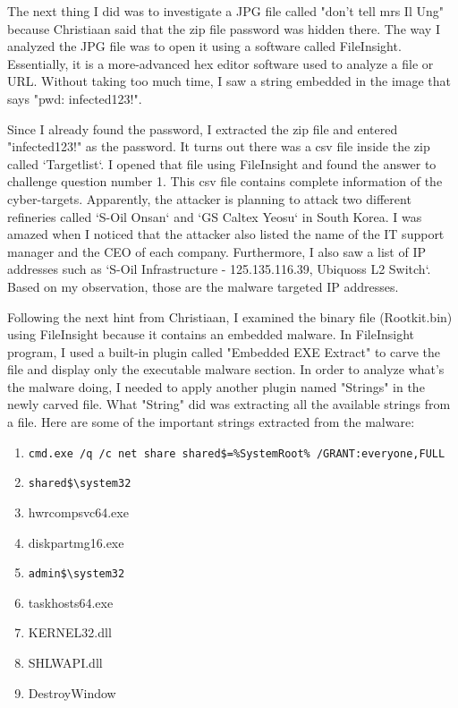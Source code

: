\documentclass[letterpaper,10pt,titlepage,draftclsnofoot,onecolumn]{IEEEtran}
\begin{document}
The next thing I did was to investigate a JPG file called "don't tell mrs Il Ung" because Christiaan said that the zip file password was hidden there. 
The way I analyzed the JPG file was to open it using a software called FileInsight. 
Essentially, it is a more-advanced hex editor software used to analyze a file or URL.
Without taking too much time, I saw a string embedded in the image that says "pwd: infected123!".

Since I already found the password, I extracted the zip file and entered "infected123!" as the password. 
It turns out there was a csv file inside the zip called `Targetlist`.
I opened that file using FileInsight and found the answer to challenge question number 1.
This csv file contains complete information of the cyber-targets. 
Apparently, the attacker is planning to attack two different refineries called `S-Oil Onsan` and `GS Caltex Yeosu` in South Korea. 
I was amazed when I noticed that the attacker also listed the name of the IT support manager and the CEO of each company. 
Furthermore, I also saw a list of IP addresses such as `S-Oil Infrastructure - 125.135.116.39, Ubiquoss L2 Switch`. 
Based on my observation, those are the malware targeted IP addresses. 

Following the next hint from Christiaan, I examined the binary file (Rootkit.bin) using FileInsight because it contains an embedded malware. 
In FileInsight program, I used a built-in plugin called "Embedded EXE Extract" to carve the file and display only the executable malware section. 
In order to analyze what's the malware doing, I needed to apply another plugin named "Strings" in the newly carved file. 
What "String" did was extracting all the available strings from a file.
Here are some of the important strings extracted from the malware:
\begin{enumerate}
\item \verb|cmd.exe /q /c net share shared$=%SystemRoot% /GRANT:everyone,FULL|
\item \verb|shared$\system32|
\item hwrcompsvc64.exe
\item diskpartmg16.exe
\item \verb|admin$\system32|
\item taskhosts64.exe
\item KERNEL32.dll
\item SHLWAPI.dll
\item DestroyWindow
\end{enumerate}
\end{document}
